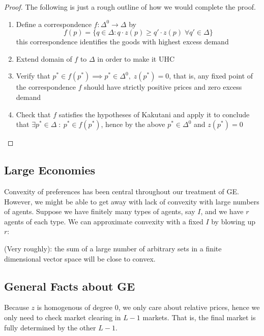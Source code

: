 \begin{proof}
  The following is just a rough outline of how we would complete the
  proof.

  \begin{enumerate}
  \item Define a correspondence $f: \Delta^0 \to \Delta$ by
    \[
    f(p) 
    = \{q \in \Delta : q \cdot z(p) \geq q' \cdot z(p) \; \forall q' \in \Delta\}
    \]
    this correspondence identifies the goods with highest excess demand
  \item Extend domain of $f$ to $\Delta$ in order to make it UHC
  \item Verify that $p^* \in f(p^*) \implies p^* \in \Delta^0, \;
    z(p^*) = 0$, that is, any fixed point of the correspondence $f$
    should have strictly positive prices and zero excess demand
  \item Check that $f$ satisfies the hypotheses of Kakutani and apply
    it to conclude that $\exists p^* \in \Delta \; : \: p^* \in
    f(p^*)$, hence by the above $p^* \in \Delta^0$ and $z(p^*) = 0$
  \end{enumerate}
\end{proof}

\subsection{Large Economies}

Convexity of preferences has been central throughout our treatment of
GE. However, we might be able to get away with lack of convexity with
large numbers of agents. Suppose we have finitely many types of
agents, say $I$, and we have $r$ agents of each type. We can
approximate convexity with a fixed $I$ by blowing up $r$:

\begin{theorem}
  (Very roughly): the sum of a large number of arbitrary sets in a
  finite dimensional vector space will be close to convex.
\end{theorem}


\subsection{General Facts about GE}
\label{sec:general-facts-ge}

Because $z$ is homogenous of degree $0$, we only care about relative
prices, hence we only need to check market clearing in $L-1$
markets. That is, the final market is fully determined by the other
$L-1$.

